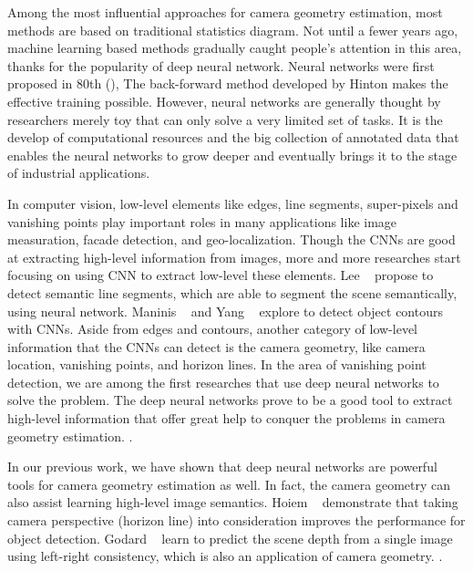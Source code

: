 Among the most influential approaches for camera geometry estimation,
most methods are based on traditional statistics diagram. Not until a
fewer years ago, machine learning based methods gradually caught
people's attention in this area, thanks for the popularity of deep
neural network. Neural networks were first proposed in 80th
(), The back-forward method developed by Hinton
 makes the effective training possible. However, neural
networks are generally thought by researchers merely toy that can only
solve a very limited set of tasks. It is the develop of computational
resources and the big collection of annotated data that enables the
neural networks to grow deeper and eventually brings it to the stage of
industrial applications.

In computer vision, low-level elements like edges, line segments,
super-pixels and vanishing points play important roles in many
applications like image measuration, facade detection, and
geo-localization.
Though the CNNs are good at extracting high-level information from
images, more and more researches start focusing on using CNN to
extract low-level these elements.
%
Lee \etal~\cite{lee2017semantic} propose to detect semantic line
segments, which are able to segment the scene semantically, using
neural network. Maninis \etal~\cite{maninis2016convolutional} and Yang
\etal~\cite{yang2016object} explore to detect object contours with
CNNs.
%
Aside from edges and contours, another category of low-level
information that the CNNs can detect is the camera geometry, like
camera location, vanishing points, and horizon lines.
%
In the area of vanishing point detection, we are among the first
researches that use deep neural networks to solve the problem. The
deep neural networks prove to be a good tool to extract high-level
information that offer great help to conquer the problems in camera
geometry estimation. .

In our previous work, we have shown that deep neural networks are
powerful tools for camera geometry estimation as well. In fact, the
camera geometry can also assist learning high-level image semantics.
Hoiem \etal~\cite{hoiem2008putting} demonstrate that taking camera
perspective (horizon line) into consideration improves the performance
for object detection. Godard \etal~\cite{godard2017unsupervised} learn
to predict the scene depth from a single image using left-right
consistency, which is also an application of camera geometry.
.

